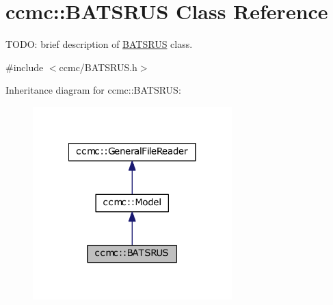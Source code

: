 \hypertarget{classccmc_1_1_b_a_t_s_r_u_s}{\section{ccmc\-:\-:B\-A\-T\-S\-R\-U\-S Class Reference}
\label{classccmc_1_1_b_a_t_s_r_u_s}
}


T\-O\-D\-O\-: brief description of \hyperlink{classccmc_1_1_b_a_t_s_r_u_s}{B\-A\-T\-S\-R\-U\-S} class.  




{\ttfamily \#include $<$ccmc/\-B\-A\-T\-S\-R\-U\-S.\-h$>$}



Inheritance diagram for ccmc\-:\-:B\-A\-T\-S\-R\-U\-S\-:
\nopagebreak
\begin{figure}[H]
\begin{center}
\leavevmode
\includegraphics[width=218pt]{classccmc_1_1_b_a_t_s_r_u_s__inherit__graph}
\end{center}
\end{figure}


